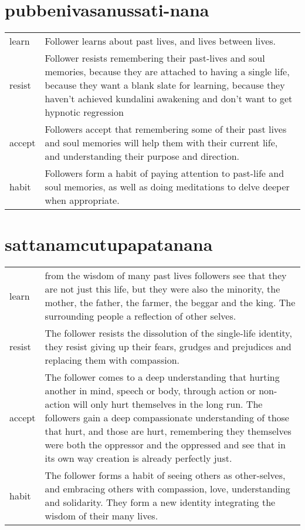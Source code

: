\chapter{pubbenivasanussati-nana}\label{chapter9}
\begin{tabular}{lp{}}
learn & Follower learns about past lives, and lives between lives.\\
resist & Follower resists remembering their past-lives and soul memories,
because they are attached to having a single life,
because they want a blank slate for learning,
because they haven't achieved kundalini awakening 
and don't want to get hypnotic regression\\
accept & Followers accept that remembering some of their 
past lives and soul memories will help them with their current life,
and understanding their purpose and direction.\\
habit & Followers form a habit of paying attention to past-life and soul
memories, as well as doing meditations to delve deeper when appropriate.\\
\end{tabular}


\chapter{sattanamcutupapatanana}


\begin{tabular}{lp{}}
learn & from the wisdom of many past lives followers see that they are
not just this life, but they were also the minority, the mother, the father, the
farmer, the beggar and the king. The surrounding people a reflection of other
selves.\\
resist & The follower resists the dissolution of the single-life
identity, they resist giving up their fears, grudges and prejudices and
replacing them with compassion.\\
accept & The follower comes to a deep understanding that hurting another in mind, speech or
body, through action or non-action will only hurt themselves in the long run. 
The followers gain a deep compassionate understanding of those that hurt, and
those are hurt, remembering they themselves were both the oppressor and the
oppressed and see that in its own way creation is already perfectly just.\\
habit & The follower forms a habit of seeing others as other-selves,
and embracing others with compassion, love, understanding and solidarity. They
form a new identity integrating the wisdom of their many lives.\\
\end{tabular}


